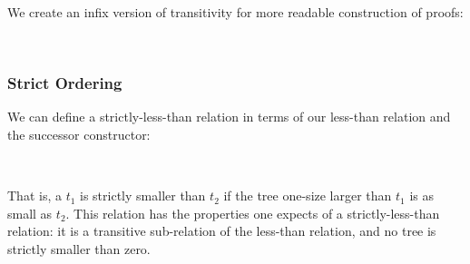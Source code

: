 We create an infix version of transitivity for more readable construction of proofs:
\begin{code}%
%
\>[4]\AgdaSpace{}%
\AgdaSymbol{:}%
\>[12]\AgdaSpace{}%
\AgdaSymbol{\{}\AgdaSpace{}%
\AgdaSpace{}%
\AgdaSymbol{\}}\AgdaSpace{}%
\AgdaSpace{}%
\AgdaSpace{}%
\AgdaSpace{}%
\AgdaSpace{}%
\AgdaSpace{}%
\AgdaSpace{}%
\AgdaSpace{}%
\AgdaSpace{}%
\AgdaSpace{}%
\AgdaSpace{}%
\AgdaSpace{}%
\<%
\\
%
\>[4]\AgdaSpace{}%
\AgdaSpace{}%
\AgdaSpace{}%
\AgdaSymbol{=}\AgdaSpace{}%
\AgdaSpace{}%
\AgdaSpace{}%
\<%
\end{code}

\subsubsection{Strict Ordering}

We can define a strictly-less-than relation in terms of our less-than relation
and the successor constructor:
\begin{code}%
%
\>[4]\AgdaOperator{\AgdaFunction{\AgdaUnderscore{}<\AgdaUnderscore{}}}\AgdaSpace{}%
\AgdaSymbol{:}\AgdaSpace{}%
\AgdaSpace{}%
\AgdaSpace{}%
\AgdaSpace{}%
\AgdaSpace{}%
\AgdaSpace{}%
\<%
\\
%
\>[4]\AgdaSpace{}%
\AgdaOperator{\AgdaFunction{<}}\AgdaSpace{}%
\AgdaSpace{}%
\AgdaSymbol{=}\AgdaSpace{}%
\AgdaSpace{}%
\AgdaSpace{}%
\AgdaSpace{}%
\<%
\end{code}

  That is, a $t_{1}$ is strictly smaller than $t_{2}$ if the tree one-size larger than $t_{1}$ is as small as $t_{2}$.
  This relation has the properties one expects of a strictly-less-than
  relation: it is a transitive  sub-relation of the less-than relation,
  and no tree is strictly smaller than zero.

